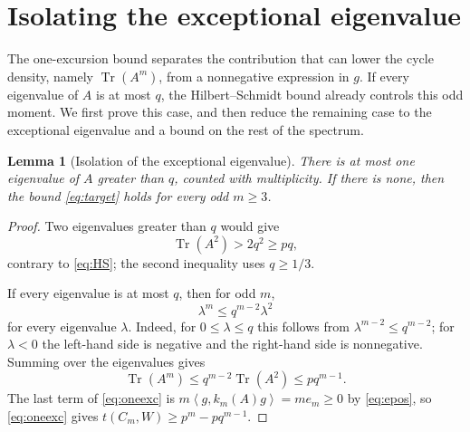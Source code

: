 \documentclass[11pt]{article}
\numberwithin{equation}{section}
\newtheorem{lemma}[theorem]{Lemma}
\newcommand{\Tr}{\operatorname{Tr}}
\newcommand{\ip}[2]{\left\langle #1,#2\right\rangle}
\begin{document}
\section{Isolating the exceptional eigenvalue}\label{sec:isolate}
The one-excursion bound separates the contribution that can lower
the cycle density, namely $\Tr(A^m)$, from a nonnegative expression
in $g$. If every eigenvalue of $A$ is at most $q$, the
Hilbert--Schmidt bound already controls this odd moment. We first
prove this case, and then reduce the remaining case to the
exceptional eigenvalue and a bound on the rest of the spectrum.
\begin{lemma}[Isolation of the exceptional eigenvalue]\label{lem:isolation}
There is at most one eigenvalue of $A$ greater than $q$, counted
with multiplicity. If there is none, then the bound
\eqref{eq:target} holds for every odd $m\ge3$.
\end{lemma}
\begin{proof}
Two eigenvalues greater than $q$ would give
\[
 \Tr(A^2)>2q^2\ge pq,
\]
contrary to \eqref{eq:HS}; the second inequality uses $q\ge1/3$.

If every eigenvalue is at most $q$, then for odd $m$,
\[
 \lambda^m\le q^{m-2}\lambda^2
\]
for every eigenvalue $\lambda$. Indeed, for $0\le\lambda\le q$
this follows from $\lambda^{m-2}\le q^{m-2}$; for $\lambda<0$
the left-hand side is negative and the right-hand side is
nonnegative. Summing over the eigenvalues gives
\[
 \Tr(A^m)\le q^{m-2}\Tr(A^2)\le pq^{m-1}.
\]
The last term of \eqref{eq:oneexc} is $m\ip{g}{k_m(A)g}=me_m\ge0$ by \eqref{eq:epos}, so \eqref{eq:oneexc} gives $t(C_m,W)\ge p^m-pq^{m-1}$.
\end{proof}
\end{document}
